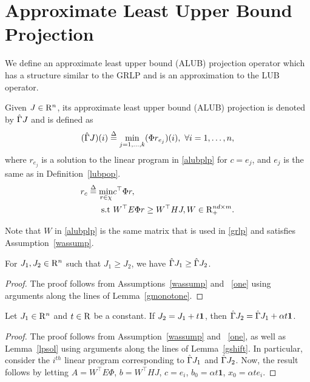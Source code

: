 \section{Approximate Least Upper Bound Projection}\label{sec:alubp}
We define an approximate least upper bound (ALUB) projection operator which has a structure similar to the GRLP and is an approximation to the LUB operator.
\begin{definition}\label{alubpop}
Given $J\in \mathrm{R}^n$, its approximate least upper bound (ALUB) projection is denoted by $\hat{\Gamma} J$ and is defined as 
\begin{align}\label{tgamdef}
(\hat{\Gamma} J)(i)\stackrel{\Delta}{=}\underset{j=1,\ldots,k}{\min} (\Phi r_{e_j})(i), \mbox{ } \forall i=1,\ldots,n,
\end{align}
where $r_{e_j}$ is a solution to the linear program in \eqref{alubplp} for $c=e_j$, and $e_j$ is the same as in Definition~\ref{lubpop}.
\begin{align}\label{alubplp}
r_c\stackrel{\Delta}{=}\min_{r\in \chi} &c^\top \Phi r,\nonumber\\
\text{s.t}\mbox{ } &W^\top E \Phi r\geq W^\top HJ, W \in \mathrm{R}^{nd\times m}_+ .
\end{align}
\end{definition}
Note that $W$ in \eqref{alubplp} is the same matrix that is used in \eqref{grlp} and satisfies Assumption~\ref{wassump}.
\begin{comment}
The main result of this section is Corollary~\ref{cmt1} which is the stepping stone for the final error bound in Corollary~\ref{cmt2}. The result in this section relates $\hv$, the fixed point of $\hg$ to $J^*$. In Corollary~\ref{cmt2}, we are particularly interested in the term $||\Gamma J^*-\hg J^*||_\infty$ which is precisely the error due to constraint approximation.
\end{comment}
\begin{lemma}\label{tgmonotone}
For $J_1, J_2\in \mathrm{R}^n$ such that $J_1\geq J_2$, we have $\hat{\Gamma} J_1\geq \hat{\Gamma} J_2$.
\end{lemma}
\begin{proof}
The proof follows from Assumptions~\ref{wassump} and ~\ref{one} using arguments along the lines of Lemma~\ref{gmonotone}.
\end{proof}
\begin{lemma}\label{tgshift}
Let $J_1\in \mathrm{R}^n$ and $t\in \mathrm{R}$ be a constant. If $J_2=J_1+t\mathbf{1}$, then $\hat{\Gamma} J_2=\hat{\Gamma} J_1+\alpha t\mathbf{1}$.
\end{lemma}
\begin{proof}
The proof follows from Assumption~\ref{wassump} and ~\ref{one}, as well as Lemma~\ref{lpsol} using arguments along the lines of Lemma~\ref{gshift}. In particular, consider the $i^{th}$ linear program corresponding to $\hat{\Gamma} J_1$ and $\hat{\Gamma} J_2$. Now, the result follows by letting $A=W^\top E \Phi$, $b=W^\top H J$, $c=e_i$, $b_0=\alpha t \mathbf{1}$, $x_0=\alpha t e_i$.
\end{proof}
